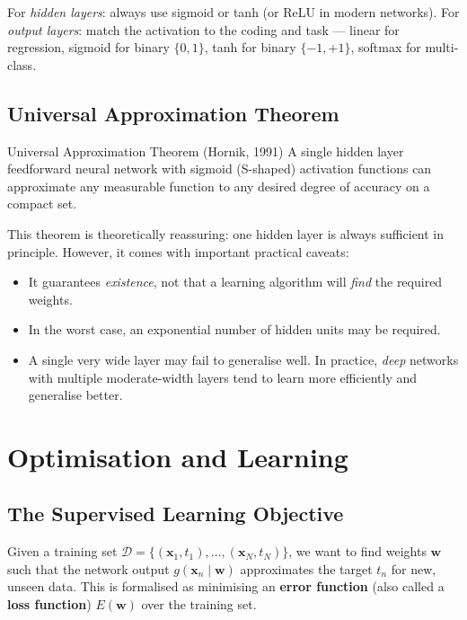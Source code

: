 \documentclass[11pt,a4paper]{article}
\newcommand{\term}[1]{\textcolor{DefGreen}{\textbf{#1}}\index{#1}}
\begin{document}
\begin{warnbox}
For \emph{hidden layers}: always use sigmoid or tanh (or ReLU in modern networks). For \emph{output layers}: match the activation to the coding and task — linear for regression, sigmoid for binary $\{0,1\}$, tanh for binary $\{-1,+1\}$, softmax for multi-class.
\end{warnbox}

\subsection{Universal Approximation Theorem}

\begin{thmbox}{Universal Approximation Theorem (Hornik, 1991)}
A single hidden layer feedforward neural network with sigmoid (S-shaped) activation functions can approximate any measurable function to any desired degree of accuracy on a compact set.
\end{thmbox}

This theorem is theoretically reassuring: one hidden layer is always sufficient in principle. However, it comes with important practical caveats:
\begin{itemize}
  \item It guarantees \emph{existence}, not that a learning algorithm will \emph{find} the required weights.
  \item In the worst case, an exponential number of hidden units may be required.
  \item A single very wide layer may fail to generalise well. In practice, \emph{deep} networks with multiple moderate-width layers tend to learn more efficiently and generalise better.
\end{itemize}

\section{Optimisation and Learning}

\subsection{The Supervised Learning Objective}

Given a training set $\mathcal{D} = \{(\mathbf{x}_1, t_1), \ldots, (\mathbf{x}_N, t_N)\}$, we want to find weights $\mathbf{w}$ such that the network output $g(\mathbf{x}_n \mid \mathbf{w})$ approximates the target $t_n$ for new, unseen data. This is formalised as minimising an \term{error function} (also called a \term{loss function}) $E(\mathbf{w})$ over the training set.
\end{document}
